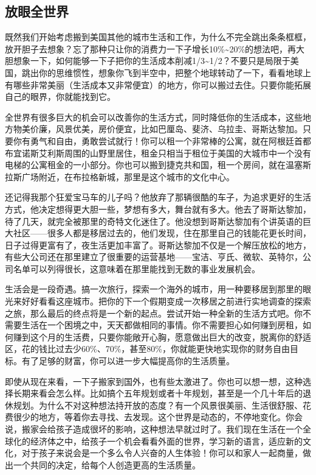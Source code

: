 \subsection{放眼全世界}

既然我们开始考虑搬到美国其他的城市生活和工作，为什么不完全跳出条条框框，放开胆子去想象？忘了那种只让你的消费力一下子增长10\%\textasciitilde{}20\%的想法吧，再大胆想象一下，如何能够一下子把你的生活成本削减1/3\textasciitilde{}1/2？不要只是局限于美国，跳出你的思维惯性，想象你飞到半空中，把整个地球转动了一下，看看地球上有哪些非常美丽（生活成本又非常便宜）的地方，你可以搬过去住。只要你能拓展自己的眼界，你就能找到它。

全世界有很多巨大的机会可以改善你的生活方式，同时降低你的生活成本，这些地方物美价廉，风景优美，房价便宜，比如巴厘岛、斐济、乌拉圭、哥斯达黎加。只要你有勇气和自由，勇敢尝试就行！你可以租一个非常棒的公寓，就在阿根廷首都布宜诺斯艾利斯周围的山野里居住，租金只相当于租位于美国的大城市中一个没有电梯的公寓租金的一小部分。你也可以搬到捷克共和国，租一个房间，就在温塞斯拉斯广场附近，在布拉格新城，那里是这个城市的文化中心。

还记得我那个狂爱宝马车的儿子吗？他放弃了那辆很酷的车子，为追求更好的生活方式，他决定想得更大胆一些，梦想有多大，舞台就有多大。他去了哥斯达黎加，待了几天，就完全被那里的奇特文化迷住了。他没想到哥斯达黎加有个讲英语的巨大社区——很多人都是移居过去的，他们发现，住在那里自己的钱能花更长时间，日子过得更富有了，夜生活更加丰富了。哥斯达黎加不仅是一个解压放松的地方，有些大公司还在那里建立了很重要的运营基地——宝洁、亨氏、微软、英特尔，公司名单可以列得很长，这意味着在那里能找到无数的事业发展机会。

生活会是一段奇遇。搞一次旅行，探索一个海外的城市，用一种要移居到那里的眼光来好好看看这座城市。把你的下一个假期变成一次移居之前进行实地调查的探索之旅，那么最后的终点将是一个新的起点。尝试开始一种全新的生活方式吧。你不需要生活在一个困境之中，天天都做相同的事情。你不需要担心如何赚到房租，如何赚到这个月的生活费，只要你能敞开心胸，愿意做出巨大的改变，脱离你的舒适区，花的钱比过去少60\%、70\%，甚至80\%，你就能更快地实现你的财务自由目标。有了足够的财富，你可以进一步大幅提高你的生活质量。

即使从现在来看，一下子搬家到国外，也有些太激进了。你也可以想一想，这种选择长期来看会怎么样。比如搞个五年规划或者十年规划，甚至是一个几十年后的退休规划。为什么不对这种想法持开放的态度？有一个风景很美丽、生活很舒服、花费很少的地方，等着你去寻找、去发现。这个世界是动态的，不停地变化。你会说，搬家会给孩子造成很坏的影响，这种想法早就过时了。我们现在生活在一个全球化的经济体之中，给孩子一个机会看看外面的世界，学习新的语言，适应新的文化，对于孩子来说会是一个多么令人兴奋的人生体验！你可以和家人一起商量，做出一个共同的决定，给每个人创造更高的生活质量。

